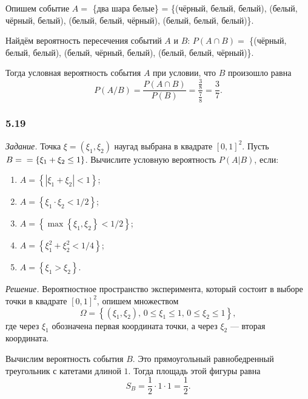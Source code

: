 Опишем событие $A =$ \{два шара белые\} = \{(чёрный, белый, белый), (белый, чёрный, белый), (белый, белый, чёрный), (белый, белый, белый)\}.

Найдём вероятность пересечения событий $A$ и $B: \, P \left( A \cap B \right) =$ \{(чёрный, белый, белый), (белый, чёрный, белый), (белый, белый, чёрный)\}.

Тогда условная вероятность события $A$ при условии, что $B$ произошло равна
$$P \left( A/B \right) =
\frac{P \left( A \cap B \right) }{P \left( B \right) } =
\frac{ \frac{3}{8} }{ \frac{7}{8} } =
\frac{3}{7}.$$

\subsubsection*{5.19}

\textit{Задание.} Точка $ \xi = \left( \xi_1, \xi_2 \right) $ наугад выбрана в квадрате $ \left[ 0, 1 \right]^2$.
Пусть $B = \\ = \left\{ \xi_1 + \xi_2 \leq 1 \right\} $.
Вычислите условную вероятность $P \left( \left. A \right| B \right) $, если:
\begin{enumerate}[label=\alph*)]
\item $A = \left\{ \left| \xi_1 + \xi_2 \right| < 1 \right\} $;
\item $A = \left\{ \xi_1 \cdot \xi_2 < 1/2 \right\} $;
\item $A = \left\{ \max \left\{ \xi_1, \xi_2 \right\} < 1/2 \right\} $;
\item $A = \left\{ \xi_1^2 + \xi_2^2 < 1/4 \right\} $;
\item $A = \left\{ \xi_1 > \xi_2 \right\} $.
\end{enumerate}

\textit{Решение.}
Вероятностное пространство эксперимента,
который состоит в выборе точки в квадрате
$ \left[ 0, 1 \right]^2$, опишем множеством
$$ \Omega =
\left\{ \left( \xi_1, \xi_2 \right), \,
0 \leq \xi_1 \leq 1, \,
0 \leq \xi_2 \leq 1 \right\},$$
где через $ \xi_1$ обозначена первая координата точки, а через $ \xi_2$ --- вторая координата.

Вычислим вероятность события $B$.
Это прямоугольный равнобедренный треугольник с катетами длиной $1$.
Тогда площадь этой фигуры равна
$$S_B =
\frac{1}{2} \cdot 1 \cdot 1 =
\frac{1}{2}.$$

